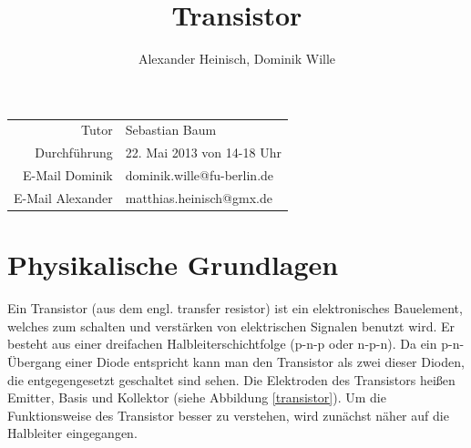 \documentclass{article}
\title{Transistor}
\author{Alexander Heinisch, Dominik Wille}
\begin{document}
\maketitle
\begin{center}
\begin{minipage}{\linewidth}
\centering
{}
\label{ringe}
\end{minipage}
\end{center}
\vspace{3cm}
\noindent
\begin{center}
\begin{tabular}{r l}
Tutor & Sebastian Baum  \\
Durchführung & 22. Mai 2013 von 14-18 Uhr \\

E-Mail Dominik & dominik.wille@fu-berlin.de \\
E-Mail Alexander & matthias.heinisch@gmx.de \\
\end{tabular}
\end{center}

\newpage
\tableofcontents
\newpage

\section{Physikalische Grundlagen}
Ein Transistor (aus dem engl. transfer resistor) ist ein elektronisches Bauelement, welches zum
schalten und verstärken von elektrischen Signalen benutzt wird. Er besteht aus einer dreifachen
Halbleiterschichtfolge (p-n-p oder n-p-n). Da ein p-n-Übergang einer Diode entspricht kann man den 
Transistor als zwei dieser Dioden, die entgegengesetzt geschaltet sind sehen. Die Elektroden des
Transistors heißen Emitter, Basis und Kollektor (siehe Abbildung \ref{transistor}). Um die 
Funktionsweise des Transistor besser zu verstehen, wird zunächst näher auf die Halbleiter 
eingegangen.
\end{document}
